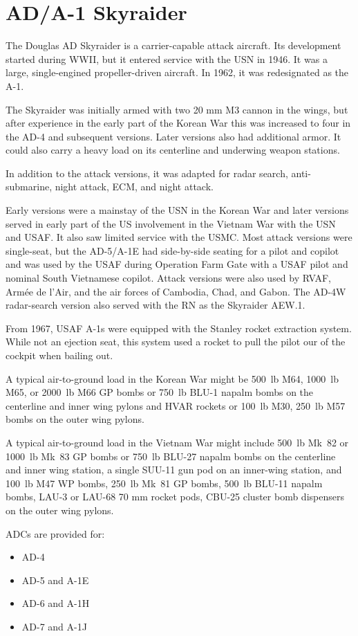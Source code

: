 \section*{AD/A-1 Skyraider}

The Douglas AD Skyraider is a carrier-capable attack aircraft. Its development started during WWII, but it entered service with the USN in 1946. It was a large, single-engined propeller-driven aircraft. In 1962, it was redesignated as the A-1.

The Skyraider was initially armed with two 20 mm M3 cannon in the wings, but after experience in the early part of the Korean War this was increased to four in the AD-4 and subsequent versions. Later versions also had additional armor. It could also carry a heavy load on its centerline and underwing weapon stations.

In addition to the attack versions, it was adapted for radar search, anti-submarine, night attack, ECM, and night attack.

Early versions were a mainstay of the USN in the Korean War and later versions served in early part of the US involvement in the Vietnam War with the USN and USAF. It also saw limited service with the USMC. Most attack versions were single-seat, but the AD-5/A-1E had side-by-side seating for a pilot and copilot and was used by the USAF during Operation Farm Gate with a USAF pilot and nominal South Vietnamese copilot. Attack versions were also used by RVAF, Armée de l'Air, and the air forces of Cambodia, Chad, and Gabon. The AD-4W radar-search version also served with the RN as the Skyraider AEW.1.

From 1967, USAF A-1s were equipped with the Stanley rocket extraction system. While not an ejection seat, this system used a rocket to pull the pilot our of the cockpit when bailing out.

A typical air-to-ground load in the Korean War might be 500~lb M64, 1000~lb M65, or 2000~lb M66 GP bombs or 750~lb BLU-1 napalm bombs on the centerline and inner wing pylons and HVAR rockets or 100~lb M30, 250~lb M57 bombs on the outer wing pylons.

A typical air-to-ground load in the Vietnam War might include 500~lb Mk~82 or 1000~lb Mk~83 GP bombs or 750~lb BLU-27 napalm bombs on the centerline and inner wing station, a single SUU-11 gun pod on an inner-wing station, and 100~lb M47 WP bombs, 250~lb Mk~81 GP bombs, 500~lb BLU-11 napalm bombs, LAU-3 or LAU-68 70 mm rocket pods, CBU-25 cluster bomb dispensers on the outer wing pylons.

ADCs are provided for:
\begin{itemize}
    \item AD-4
    \item AD-5 and A-1E
    \item AD-6 and A-1H
    \item AD-7 and A-1J
\end{itemize}